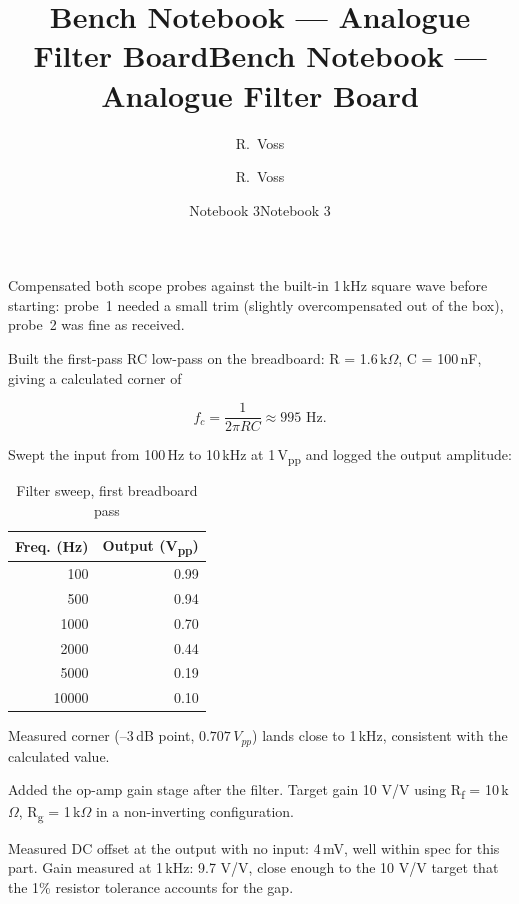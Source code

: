 \documentclass[a5paper,10pt,idxtotoc]{labbook}
\title{Bench Notebook --- Analogue Filter Board}
\author{R.\ Voss}
\date{Notebook 3}
\begin{document}
\frontmatter
\title{Bench Notebook --- Analogue Filter Board}
\author{R.\ Voss}
\date{Notebook 3}
\maketitle
\printindex
\tableofcontents

\mainmatter


Compensated both scope probes against the built-in 1\,kHz square wave before
starting: probe~1 needed a small trim (slightly overcompensated out of the
box), probe~2 was fine as received.

Built the first-pass RC low-pass on the breadboard: R = 1.6\,k$\Omega$,
C = 100\,nF, giving a calculated corner of

\[
  f_c = \frac{1}{2\pi RC} \approx 995\text{ Hz}.
\]

Swept the input from 100\,Hz to 10\,kHz at 1\,V\textsubscript{pp} and logged
the output amplitude:

\begin{table}[h]
  \centering
  \begin{tabular}{rr}
    \toprule
    Freq. (Hz) & Output (V\textsubscript{pp}) \\
    \midrule
    100  & 0.99 \\
    500  & 0.94 \\
    1000 & 0.70 \\
    2000 & 0.44 \\
    5000 & 0.19 \\
    10000 & 0.10 \\
    \bottomrule
  \end{tabular}
  \caption{Filter sweep, first breadboard pass}
\end{table}

Measured corner (--3\,dB point, $0.707\,V_{pp}$) lands close to 1\,kHz,
consistent with the calculated value.


Added the op-amp gain stage after the filter. Target gain 10 V/V using
R\textsubscript{f} = 10\,k$\Omega$, R\textsubscript{g} = 1\,k$\Omega$ in a
non-inverting configuration.

Measured DC offset at the output with no input: 4\,mV, well within spec for
this part. Gain measured at 1\,kHz: 9.7 V/V, close enough to the 10 V/V
target that the 1\% resistor tolerance accounts for the gap.
\end{document}
